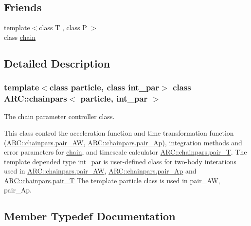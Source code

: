 \subsection*{Friends}
\begin{DoxyCompactItemize}
\item 
{\footnotesize template$<$class T , class P $>$ }\\class \hyperlink{classARC_1_1chainpars_a569feb0e3508338e81284973f08c5750}{chain}
\end{DoxyCompactItemize}


\subsection{Detailed Description}
\subsubsection*{template$<$class particle, class int\+\_\+par$>$\newline
class A\+R\+C\+::chainpars$<$ particle, int\+\_\+par $>$}

The chain parameter controller class. 

This class control the acceleration function and time transformation function (\hyperlink{classARC_1_1chainpars_a766866c2e38b475767a4f8529624a378}{A\+R\+C\+::chainpars.\+pair\+\_\+\+AW}, \hyperlink{classARC_1_1chainpars_aa34d083090c50f572d2126262e169474}{A\+R\+C\+::chainpars.\+pair\+\_\+\+Ap}), integration methods and error parameters for \hyperlink{classARC_1_1chain}{chain}, and timescale calculator \hyperlink{classARC_1_1chainpars_a343fccd377d7215a4af2e909f3f9acf6}{A\+R\+C\+::chainpars.\+pair\+\_\+T}. The template depended type int\+\_\+par is user-\/defined class for two-\/body interations used in \hyperlink{classARC_1_1chainpars_a766866c2e38b475767a4f8529624a378}{A\+R\+C\+::chainpars.\+pair\+\_\+\+AW}, \hyperlink{classARC_1_1chainpars_aa34d083090c50f572d2126262e169474}{A\+R\+C\+::chainpars.\+pair\+\_\+\+Ap} and \hyperlink{classARC_1_1chainpars_a343fccd377d7215a4af2e909f3f9acf6}{A\+R\+C\+::chainpars.\+pair\+\_\+T} The template particle class is used in pair\+\_\+\+AW, pair\+\_\+\+Ap. 

\subsection{Member Typedef Documentation}
\hypertarget{classARC_1_1chainpars_aa34d083090c50f572d2126262e169474}{}\label{classARC_1_1chainpars_aa34d083090c50f572d2126262e169474} 

